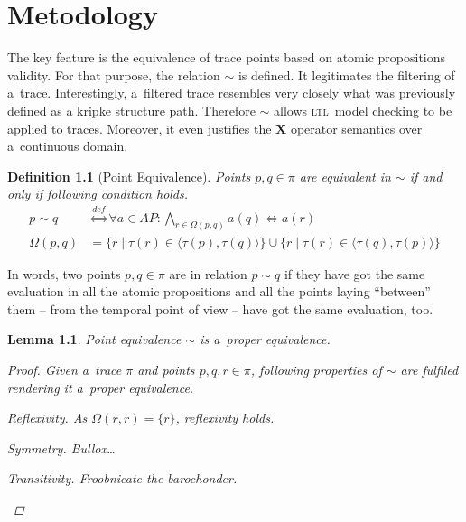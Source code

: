 \documentclass[12pt,oneside,draft]{fithesis}
\newcommand{\ltl}{\textsc{ltl}~}
\newcommand{\bX}{\mathbf{X}}
\newtheorem{mydef}{Definition}
\newtheorem{mylemma}{Lemma}
\begin{document}
\chapter{Metodology}
The key feature is the equivalence of trace points based on atomic
propositions validity. For that purpose, the relation $\sim$ is defined.
It legitimates the filtering of a~trace. Interestingly,
a~filtered trace resembles very closely what was previously defined as
a kripke structure path. Therefore $\sim$ allows \ltl model checking
to be applied to traces. Moreover, it even justifies the $\bX$ operator
semantics over a~continuous domain.
\begin{mydef}[Point Equivalence]
Points $p,q\in\pi$ are equivalent in $\sim$ if and only if following
condition holds.
\begin{align}
	p\sim q	&\overset{def}{\iff}\forall a\in AP:
		\bigwedge_{r\in\Omega(p,q)}a(q)\iff a(r)\\
\Omega(p,q)&=\{r\mid\tau(r)\in\langle\tau(p),\tau(q)\rangle\}\cup
	\{r\mid\tau(r)\in\langle\tau(q),\tau(p)\rangle\}
\end{align}
\end{mydef}
In words, two points $p,q\in\pi$ are in relation $p\sim q$ if they
have got the same evaluation in all the atomic propositions and all the
points laying ``between'' them -- from the temporal point of view --
have got the same evaluation, too.
\begin{mylemma}
Point equivalence $\sim$ is a~proper equivalence.
\begin{proof}Given a~trace $\pi$ and points $p,q,r\in\pi$, following
properties of $\sim$ are fulfiled rendering it a~proper equivalence.
	\begin{inparaenum}
		\item{Reflexivity.} As $\Omega(r,r)=\{r\}$, reflexivity holds.
		\item{Symmetry.} Bullox\dots
		\item{Transitivity.} Froobnicate the barochonder.
	\end{inparaenum}
	\qedhere
\end{proof}
\end{mylemma}
\end{document}
